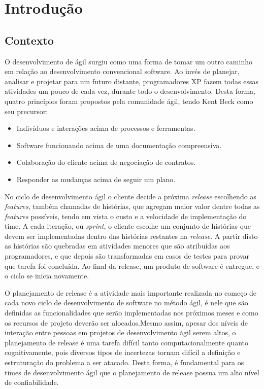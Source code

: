 \chapter{Introdução}
\label{int}
\section{Contexto}
\label{int:con}
O desenvolvimento de ágil surgiu como uma forma de tomar um outro
caminho em relação ao desenvolvimento convencional software. Ao invés de planejar,
analisar e projetar para um futuro distante, programadores XP fazem todas essas
atividades um pouco de cada vez, durante todo o desenvolvimento\cite{XP}.
Desta forma, quatro princípios foram propostos pela comunidade ágil, tendo Kent
Beck como seu precursor\cite{beckManifesto}:
\begin{itemize}
    \item Indivíduos e interações acima de processos e ferramentas.
    \item Software funcionando acima de uma documentação compreensiva.
    \item Colaboração do cliente acima de negociação de contratos.
    \item Responder as mudanças acima de seguir um plano.
\end{itemize}

No ciclo de desenvolvimento ágil o cliente decide a próxima \textit{release}
escolhendo as \textit{features}, também chamadas de histórias, que agregam
maior valor dentre todas as \textit{features} possíveis, tendo em vista  o custo
e a velocidade de implementação do time. A cada iteração, ou \textit{sprint}, o
cliente escolhe um conjunto de  histórias que devem ser implementadas dentro das
histórias restantes na \textit{release}. A partir disto as histórias são quebradas em
atividades menores que são atribuídas aos programadores, e que depois são
transformadas em casos de testes para provar que tarefa foi concluída\cite{XP}.
Ao final da release, um produto de software é entregue, e o ciclo se inicia
novamente.

O planejamento de release é a atividade mais importante realizada no começo de
cada novo ciclo de desenvolvimento de software no método ágil, é nele que são
definidas as funcionalidades que serão implementadas nos próximos meses e como
os recursos de projeto deverão ser alocados.Mesmo assim, apesar dos níveis de
interação entre pessoas em projetos de desenvolvimento ágil serem altos,
o planejamento de  release é uma tarefa difícil tanto computacionalmente quanto
cognitivamente, pois diversos tipos de incertezas tornam difícil a definição e
estruturação do problema a ser atacado\cite{Ngo}. Desta forma, é fundamental para
os times de desenvolvimento ágil que o planejamento de release possua um alto
nível de confiabilidade\cite{McDaid}.

